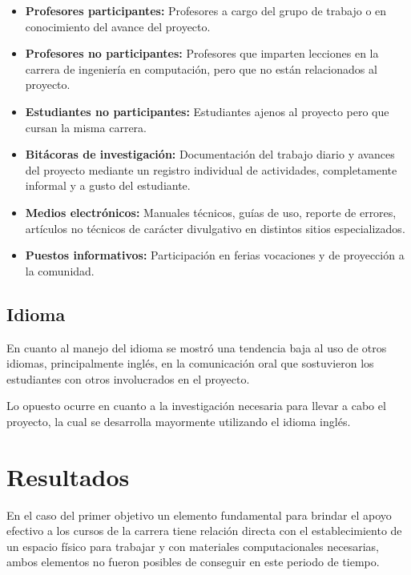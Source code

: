 \documentclass[conference]{IEEEtran}
\begin{document}
\begin{itemize}
    \item \textbf{Profesores participantes:} Profesores a cargo del grupo de
        trabajo o en conocimiento del avance del proyecto.

    \item \textbf{Profesores no participantes:} Profesores que imparten
        lecciones en la carrera de ingeniería en computación, pero que no están
        relacionados al proyecto.

    \item \textbf{Estudiantes no participantes:} Estudiantes ajenos al proyecto
        pero que cursan la misma carrera.

    \item \textbf{Bitácoras de investigación:} Documentación del trabajo diario
        y avances del proyecto mediante un registro individual de actividades,
        completamente informal y a gusto del estudiante.

    \item \textbf{Medios electrónicos:} Manuales técnicos, guías de uso, reporte
        de errores, artículos no técnicos de carácter divulgativo en distintos
        sitios especializados.

    \item \textbf{Puestos informativos:} Participación en ferias vocaciones y de
        proyección a la comunidad.
\end{itemize}

\subsection*{Idioma}

En cuanto al manejo del idioma se mostró una tendencia baja al uso de otros
idiomas, principalmente inglés, en la comunicación oral que sostuvieron los
estudiantes con otros involucrados en el proyecto.  

Lo opuesto ocurre en cuanto a la investigación necesaria para llevar a cabo el
proyecto, la cual se desarrolla mayormente utilizando el idioma inglés.


\section{Resultados}

En el caso del primer objetivo un elemento fundamental para brindar el apoyo
efectivo a los cursos de la carrera tiene relación directa con el
establecimiento de un espacio físico para trabajar y con materiales
computacionales necesarias, ambos elementos no fueron posibles de conseguir en
este periodo de tiempo. 
\end{document}
